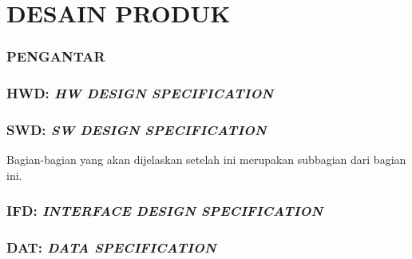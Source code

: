\part*{\centering\textsf{\large DESAIN PRODUK}}


\section*{\textcolor{sectioncolor}{\textsf{\large PENGANTAR}}}







\section*{\textcolor{sectioncolor}{\textsf{\large HWD: \textit{HW DESIGN SPECIFICATION}}}}








\section*{\textcolor{sectioncolor}{\textsf{\large SWD: \textit{SW DESIGN SPECIFICATION}}}}

Bagian-bagian yang akan dijelaskan setelah ini merupakan subbagian dari bagian ini.


\section*{\textcolor{sectioncolor}{\textsf{\large IFD: \textit{INTERFACE DESIGN SPECIFICATION}}}}






\section*{\textcolor{sectioncolor}{\textsf{\large DAT: \textit{DATA SPECIFICATION}}}}






